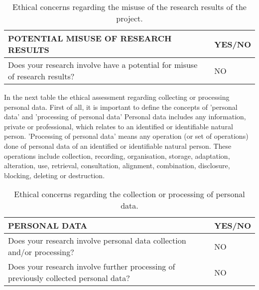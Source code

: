 \begin{table}[H]
	\centering
	\begin{tabular}[H]{>{\arraybackslash}p{10cm}
			>{\arraybackslash}p{3cm} }
		\toprule[2pt]
		
		\textbf{POTENTIAL MISUSE OF RESEARCH RESULTS} & \textbf{YES/NO} \\
		\midrule[1.5pt]
		Does your research involve have a potential for misuse of research results? & NO\\
		\bottomrule[2pt]		
	\end{tabular}
	\caption[Ethics - Misuse of results]{Ethical concerns regarding the misuse of the research results of the project.}
	\label{Ethics_Misuse}
\end{table}

In the next table the ethical assessment regarding collecting or processing personal data. First of all, it is important to define the concepts of 'personal data' and 'processing of personal data' Personal data includes any information, private or professional, which relates to an identified or identifiable natural person. 'Processing of personal data' means any operation (or set of operations) done of personal data of an identified or identifiable natural person. These operations include collection, recording, organisation, storage, adaptation, alteration, use, retrieval, consultation, alignment, combination, disclosure, blocking, deleting or destruction.\\

\begin{table}[H]
	\centering
	\begin{tabular}[H]{>{\arraybackslash}p{10cm}
			>{\arraybackslash}p{3cm} }
		\toprule[2pt]
		
		\textbf{PERSONAL DATA} & \textbf{YES/NO} \\
		\midrule[1.5pt]
		Does your research involve personal data collection and/or processing? & NO\\
		Does your research involve further processing of previously collected personal data? & NO\\
	    \bottomrule[2pt]		
	\end{tabular}
	\caption[Ethics - Personal data]{Ethical concerns regarding the collection or processing of personal data.}
	\label{Ethics_personaldata}
\end{table}